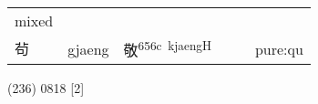 \documentclass[14pt,a4paper]{scrartcl}
\begin{document}
\begin{longtable}[c]{@{}llllll@{}}
\begin{minipage}[t]{0.14\columnwidth}\raggedright\strut
mixed
\strut\end{minipage}\tabularnewline
\begin{minipage}[t]{0.14\columnwidth}\raggedright\strut
茍
\strut\end{minipage} &
\begin{minipage}[t]{0.14\columnwidth}\raggedright\strut
gjaeng
\strut\end{minipage} &
\begin{minipage}[t]{0.14\columnwidth}\raggedright\strut
敬\textsuperscript{656c~kjaengH}
\strut\end{minipage} &
\begin{minipage}[t]{0.14\columnwidth}\raggedright\strut
\strut\end{minipage} &
\begin{minipage}[t]{0.14\columnwidth}\raggedright\strut
\strut\end{minipage} &
\begin{minipage}[t]{0.14\columnwidth}\raggedright\strut
pure:qu
\strut\end{minipage}\tabularnewline
\bottomrule
\end{longtable}

(236) 0818 {[}2{]}
\end{document}
